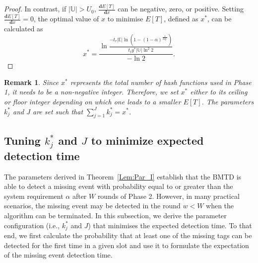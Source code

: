 \documentclass[10pt, twocolumn]{IEEEtran}
\newtheorem*{remark}{Remark}
\begin{document}
\begin{proof}
In contrast, if $|\mathbb{U}| > U_0$, $\frac{\mathbf{d}E[T]}{\mathbf{d}x}$ can be negative, zero, or positive.
Setting $\frac{\mathbf{d}E[T]}{\mathbf{d}x} =0$, the optimal value of $x$ to minimise $E[T]$, defined as $x^*$, can be calculated as
\begin{equation*}
x^* = \frac{\ln \frac{-t_r |\mathbb{E}| \ln(1-(1-\alpha)^{\frac{1}{My^*}})}{t_t y^* |\mathbb{U}| \ln^2 2}}{-\ln 2}.
\end{equation*}
\begin{comment}
 Let $\frac{\mathbf{d}E[T]}{\mathbf{d}x} =0$, we obtain
\begin{eqnarray}
x=x^* \triangleq
\begin{cases}
\frac{|\mathbb{E}| \ln \frac{M|\mathbb{E}|}{-|\mathbb{U}| \ln(1-\alpha)}} {\ln \phi},&(1-\alpha)\le \frac{1}{2}^M \\
\frac{|\mathbb{E}| \ln{\frac{|\mathbb{E}|\ln (1-(1-\alpha)^\frac{1}{M})}{|\mathbb{U}|\ln \phi}}} {\ln \phi},& (1-\alpha) > \frac{1}{2}^M
\end{cases}
\end{eqnarray}
\end{comment}
\end{proof}

\begin{remark}
Since $x^*$ represents the total number of hash functions used in Phase 1, it needs to be a non-negative integer. Therefore, we set $x^*$ either to its ceiling or floor integer depending on which one leads to a smaller $E[T]$.
The parameters $k^*_j$ and $J$ are set such that $\sum_{j=1}^{J}k^*_j = x^*$.
\end{remark}

\subsection{Tuning $k_j^*$ and $J$ to minimize expected detection time}
\label{sec:parameter_global_expected}
The parameters derived in Theorem~\ref{Lem:Par_I} establish that the BMTD is able to detect a missing event with probability equal to or greater than the system requirement $\alpha$ after $W$ rounds of Phase 2. However, in many practical scenarios, the missing event may be detected in the round $w<W$ when the algorithm can be terminated. In this subsection, we derive the parameter configuration (i.e., $k^*_j$ and $J$) that minimises the expected detection time.
To that end, we first calculate the probability that at least one of the missing tags can be detected for the first time in a given slot and use it to formulate the expectation of the missing event detection time.
\end{document}
